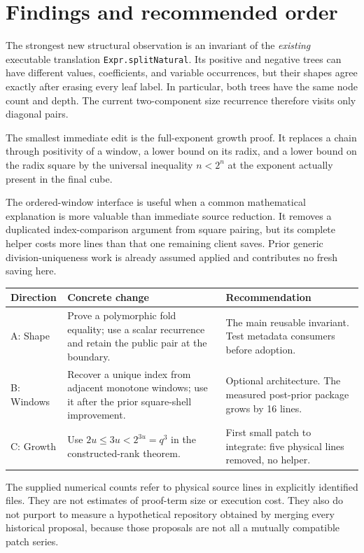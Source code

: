 \documentclass[11pt,letterpaper]{article}
\newcommand{\code}[1]{\texttt{\small #1}}
\begin{document}
\tableofcontents
\newpage

\section{Findings and recommended order}

The strongest new structural observation is an invariant of the \emph{existing} executable translation \code{Expr.splitNatural}. Its positive and negative trees can have different values, coefficients, and variable occurrences, but their shapes agree exactly after erasing every leaf label. In particular, both trees have the same node count and depth. The current two-component size recurrence therefore visits only diagonal pairs.

The smallest immediate edit is the full-exponent growth proof. It replaces a chain through positivity of a window, a lower bound on its radix, and a lower bound on the radix square by the universal inequality $n<2^n$ at the exponent actually present in the final cube.

The ordered-window interface is useful when a common mathematical explanation is more valuable than immediate source reduction. It removes a duplicated index-comparison argument from square pairing, but its complete helper costs more lines than that one remaining client saves. Prior generic division-uniqueness work is already assumed applied and contributes no fresh saving here.

\begin{table}[h]
\small
\begin{tabularx}{\textwidth}{@{}p{}YY@{}}
\toprule
Direction & Concrete change & Recommendation\\
\midrule
A: Shape & Prove a polymorphic fold equality; use a scalar recurrence and retain the public pair at the boundary. & The main reusable invariant. Test metadata consumers before adoption.\\
B: Windows & Recover a unique index from adjacent monotone windows; use it after the prior square-shell improvement. & Optional architecture. The measured post-prior package grows by 16 lines.\\
C: Growth & Use $2u\le 3u<2^{3u}=q^3$ in the constructed-rank theorem. & First small patch to integrate: five physical lines removed, no helper.\\
\bottomrule
\end{tabularx}
\end{table}

The supplied numerical counts refer to physical source lines in explicitly identified files. They are not estimates of proof-term size or execution cost. They also do not purport to measure a hypothetical repository obtained by merging every historical proposal, because those proposals are not all a mutually compatible patch series.
\end{document}
